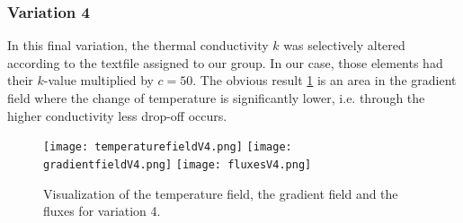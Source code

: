 \documentclass[a4paper,pt]{report}
\begin{document}
\subsubsection*{Variation 4}
In this final variation, the thermal conductivity $k$ was selectively altered according to the textfile assigned to our group. In our case, those elements had their $k$-value multiplied by $c=50$. The obvious result \ref{plotsV4} is an area in the gradient field where the change of temperature is significantly lower, i.e. through the higher conductivity less drop-off occurs.

\begin{figure}
	\centering
	\texttt{[image: temperaturefieldV4.png]}
	\texttt{[image: gradientfieldV4.png]}
	\texttt{[image: fluxesV4.png]}
	\caption{Visualization of the temperature field, the gradient field and the fluxes for variation 4.}
	\label{plotsV4}
\end{figure}
\end{document}
